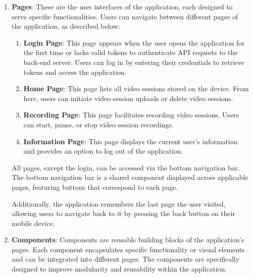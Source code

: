 \ifenglish
\begin{enumerate}
    \item \textbf{Pages}: These are the user interfaces of the application, each designed to serve specific functionalities. Users can navigate between different pages of the application, as described below:  
    \begin{enumerate}  
        \item \textbf{Login Page}: This page appears when the user opens the application for the first time or lacks valid tokens to authenticate API requests to the back-end server. Users can log in by entering their credentials to retrieve tokens and access the application.  
        \item \textbf{Home Page}: This page lists all video sessions stored on the device. From here, users can initiate video session uploads or delete video sessions.  
        \item \textbf{Recording Page}: This page facilitates recording video sessions. Users can start, pause, or stop video session recordings.  
        \item \textbf{Information Page}: This page displays the current user's information and provides an option to log out of the application.  
    \end{enumerate}  
    All pages, except the login, can be accessed via the bottom navigation bar. The bottom navigation bar is a shared component displayed across applicable pages, featuring buttons that correspond to each page.  
    
    Additionally, the application remembers the last page the user visited, allowing users to navigate back to it by pressing the back button on their mobile device.      

    \item \textbf{Components}: Components are reusable building blocks of the application's pages. Each component encapsulates specific functionality or visual elements and can be integrated into different pages. The components are specifically designed to improve modularity and reusability within the application.
    

\end{enumerate}
